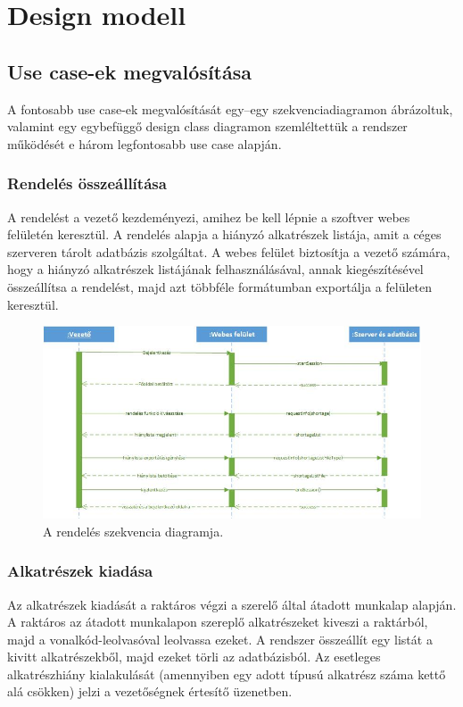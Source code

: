 \documentclass[12pt]{article}\usepackage[left=20mm,right=20mm,top=15mm,bottom=20mm]{geometry}
\begin{document}
\section{Design modell}
\subsection{Use case-ek megvalósítása}
A fontosabb use case-ek megvalósítását egy--egy szekvenciadiagramon ábrázoltuk, valamint egy egybefüggő design class diagramon szemléltettük a rendszer működését e három legfontosabb use case alapján.

\subsubsection{Rendelés összeállítása}
A rendelést a vezető kezdeményezi, amihez be kell lépnie a  szoftver webes felületén keresztül.
A rendelés alapja a hiányzó alkatrészek listája, amit a céges szerveren tárolt adatbázis szolgáltat. 
A webes felület biztosítja a vezető számára, hogy a hiányzó alkatrészek listájának felhasználásával, annak kiegészítésével összeállítsa a rendelést, majd azt többféle formátumban exportálja a felületen keresztül.

\begin{figure}[!h]
    \centering
        \includegraphics[width=\textwidth]{kepek/Rendeles_szekvencia.jpg}
        \caption{A rendelés szekvencia diagramja.}
\end{figure}

\subsubsection{Alkatrészek kiadása}
Az alkatrészek kiadását a raktáros végzi a szerelő által átadott munkalap alapján. 
A raktáros az átadott munkalapon szereplő alkatrészeket kiveszi a raktárból, majd a vonalkód-leolvasóval leolvassa ezeket. 
A rendszer összeállít egy listát a kivitt alkatrészekből, majd ezeket törli az adatbázisból.
Az esetleges alkatrészhiány kialakulását (amennyiben egy adott típusú alkatrész száma kettő alá csökken) jelzi a vezetőségnek értesítő üzenetben. 
\end{document}
